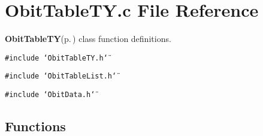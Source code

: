 \section{Obit\-Table\-TY.c File Reference}
\label{ObitTableTY_8c}
{\bf Obit\-Table\-TY}{\rm (p.\,\pageref{structObitTableTY})} class function definitions. 

{\tt \#include \char`\"{}Obit\-Table\-TY.h\char`\"{}}\par
{\tt \#include \char`\"{}Obit\-Table\-List.h\char`\"{}}\par
{\tt \#include \char`\"{}Obit\-Data.h\char`\"{}}\par
\subsection*{Functions}
